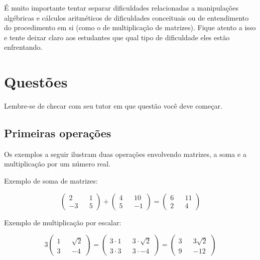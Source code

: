 \documentclass[main.tex]{subfiles}
\begin{document}
É muito importante tentar separar dificuldades relacionadas a manipulações algébricas e cálculos aritméticos de dificuldades conceituais ou de entendimento do procedimento em si (como o de multiplicação de matrizes). Fique atento a isso e tente deixar claro aos estudantes que qual tipo de dificuldade eles estão enfrentando.

\paraAmbos

\newpage

\section{Questões}

Lembre-se de checar com seu tutor em que questão você deve começar.

\subsection*{Primeiras operações}

Os exemplos a seguir ilustram duas operações envolvendo matrizes, a soma e a multiplicação por um número real.

\begin{caixaExemplo}
	Exemplo de soma de matrizes:

  $$\begin{pmatrix} 2 && 1 \\ -3 && 5 \end{pmatrix} + \begin{pmatrix} 4 && 10 \\ 5 && -1 \end{pmatrix} = \begin{pmatrix} 6 && 11 \\ 2 && 4  \end{pmatrix}$$
\end{caixaExemplo} 	

\begin{caixaExemplo}
	Exemplo de multiplicação por escalar:
 
 $$3 \begin{pmatrix} 1 && \sqrt{2} \\ 3 && -4 \end{pmatrix} = \begin{pmatrix} 3 \cdot 1 && 3 \cdot \sqrt{2} \\ 3 \cdot 3 && 3 \cdot -4 \end{pmatrix} = \begin{pmatrix} 3 && 3 \sqrt{2} \\ 9 && -12 \end{pmatrix}$$
\end{caixaExemplo}
\end{document}
